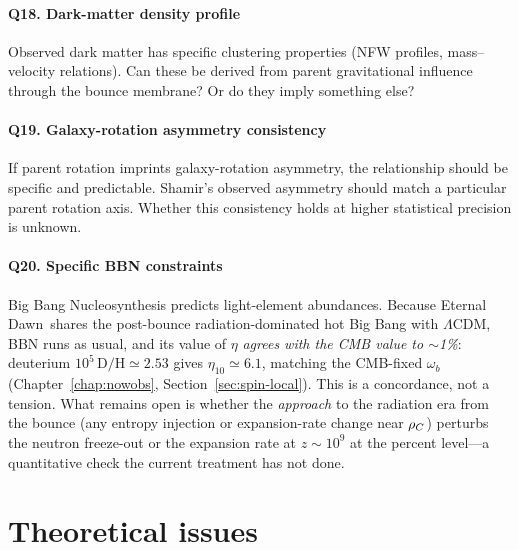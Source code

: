 \paragraph{Q18. Dark-matter density profile}
Observed dark matter has specific clustering properties (NFW profiles,
mass--velocity relations). Can these be derived from parent gravitational
influence through the bounce membrane? Or do they imply something else?

\paragraph{Q19. Galaxy-rotation asymmetry consistency}
If parent rotation imprints galaxy-rotation asymmetry, the relationship should be
specific and predictable. Shamir's observed asymmetry should match a particular
parent rotation axis. Whether this consistency holds at higher statistical
precision is unknown.

\paragraph{Q20. Specific BBN constraints}
Big Bang Nucleosynthesis predicts light-element abundances. Because Eternal Dawn\ shares the
post-bounce radiation-dominated hot Big Bang with $\Lambda$CDM, BBN runs as usual, and
its value of $\eta$ \emph{agrees with the CMB value to $\sim$1\%}: deuterium
$10^5\,\mathrm{D/H}\simeq2.53$ gives $\eta_{10}\simeq6.1$, matching the CMB-fixed
$\omega_b$ (Chapter~\ref{chap:nowobs}, Section~\ref{sec:spin-local}). This is a
concordance, not a tension. What remains open is whether the \emph{approach} to the
radiation era from the bounce (any entropy injection or expansion-rate change near
$\rho_{C}$) perturbs the neutron freeze-out or the expansion rate at $z\sim10^9$ at the
percent level---a quantitative check the current treatment has not done.

\section{Theoretical issues}

